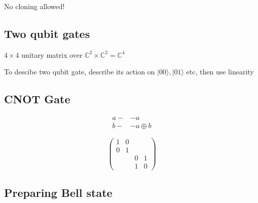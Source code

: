 \documentclass{article}
\newcommand{\<}{\langle}
\renewcommand{\>}{\rangle}
\newcommand{\q}[1] {|{#1 \rangle}}
\begin{document}
No cloning allowed!

\subsection{Two qubit gates}

$4 \times 4$ unitary matrix over $\mathbb{C}^2 \times \mathbb{C}^2 = \mathbb{C}^4$

To descibe two qubit gate, describe its action on $\q{00}, \q{01}$ etc, then use linearity

\subsection{CNOT Gate}

\begin{align}
a -&- a \\
b -&- a \oplus b
\end{align}

$$
\left(
\begin{array}{cccc}
1 & 0\\
0 & 1 \\
& & 0 & 1 \\
& & 1 & 0
\end{array}
\right)
$$

\subsection{Preparing Bell state}
\end{document}
